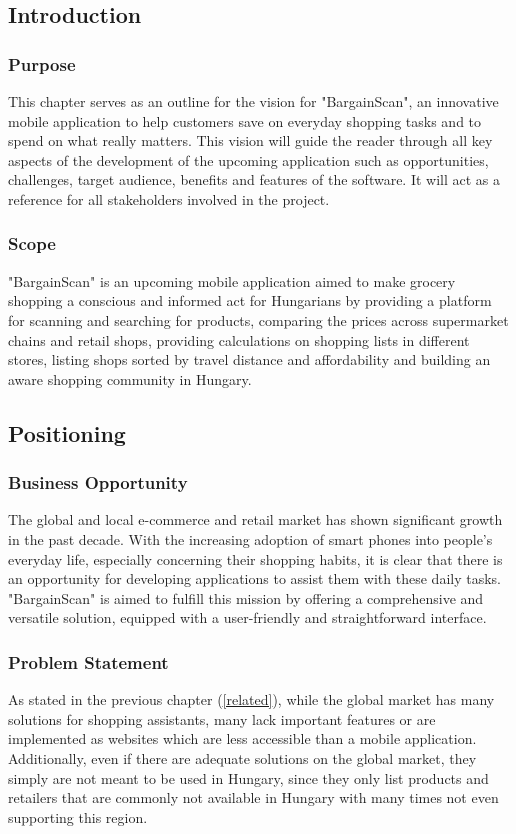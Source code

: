 \subsection{Introduction}

\subsubsection{Purpose}
This chapter serves as an outline for the vision for "BargainScan", an innovative mobile application to help customers save on everyday shopping tasks and to spend on what really matters. This vision will guide the reader through all key aspects of the development of the upcoming application such as opportunities, challenges, target audience, benefits and features of the software. It will act as a reference for all stakeholders involved in the project.

\subsubsection{Scope}
"BargainScan" is an upcoming mobile application aimed to make grocery shopping a conscious and informed act for Hungarians by providing a platform for scanning and searching for products, comparing the prices across supermarket chains and retail shops, providing calculations on shopping lists in different stores, listing shops sorted by travel distance and affordability and building an aware shopping community in Hungary.

\subsection{Positioning}

\subsubsection{Business Opportunity}
The global and local e-commerce and retail market has shown significant growth in the past decade. With the increasing adoption of smart phones into people's everyday life, especially concerning their shopping habits, it is clear that there is an opportunity for developing applications to assist them with these daily tasks. "BargainScan" is aimed to fulfill this mission by offering a comprehensive and versatile solution, equipped with a user-friendly and straightforward interface.

\subsubsection{Problem Statement} 
As stated in the previous chapter (\ref{related}), while the global market has many solutions for shopping assistants, many lack important features or are implemented as websites which are less accessible than a mobile application. Additionally, even if there are adequate solutions on the global market, they simply are not meant to be used in Hungary, since they only list products and retailers that are commonly not available in Hungary with many times not even supporting this region.

